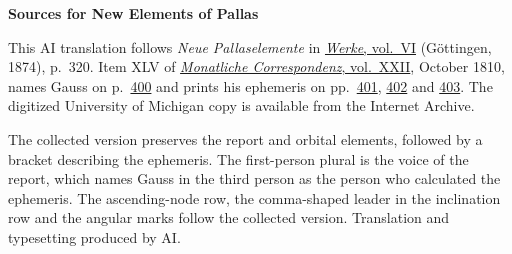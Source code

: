 \clearpage\thispagestyle{empty}
\begin{center}\textbf{Sources for New Elements of Pallas}\end{center}
\noindent This AI translation follows \textit{Neue Pallaselemente} in \href{https://gdz.sub.uni-goettingen.de/id/PPN236007467}{\textit{Werke}, vol.~VI} (Göttingen, 1874), p.~320. Item XLV of \href{https://archive.org/download/bub_gb_YCI4AAAAMAAJ/page/n4.jpg}{\textit{Monatliche Correspondenz}, vol.~XXII}, October 1810, names Gauss on p.~\href{https://archive.org/download/bub_gb_YCI4AAAAMAAJ/page/n403.jpg}{400} and prints his ephemeris on pp.~\href{https://archive.org/download/bub_gb_YCI4AAAAMAAJ/page/n404.jpg}{401}, \href{https://archive.org/download/bub_gb_YCI4AAAAMAAJ/page/n405.jpg}{402} and \href{https://archive.org/download/bub_gb_YCI4AAAAMAAJ/page/n406.jpg}{403}. The digitized University of Michigan copy is available from the Internet Archive.
\par\smallskip\noindent The collected version preserves the report and orbital elements, followed by a bracket describing the ephemeris. The first-person plural is the voice of the report, which names Gauss in the third person as the person who calculated the ephemeris. The ascending-node row, the comma-shaped leader in the inclination row and the angular marks follow the collected version. Translation and typesetting produced by AI.
\clearpage
